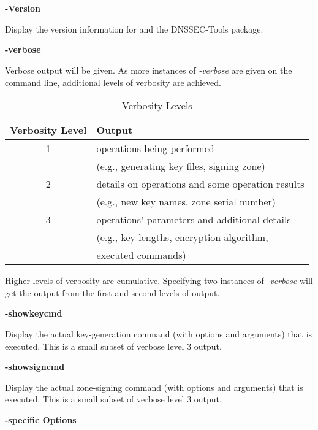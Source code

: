 \begin{description}
\item {\bf -Version}\verb" "

Display the version information for  and the DNSSEC-Tools
package.

\item {\bf -verbose}\verb" "

Verbose output will be given.  As more instances of {\it -verbose} are given
on the command line, additional levels of verbosity are achieved.

\begin{table}[ht]
\begin{center}
\begin{tabular}{|c|l|}
\hline
{\bf Verbosity Level} & {\bf Output} \\
\hline
1 & operations being performed \\
  & (e.g., generating key files, signing zone)  \\
2 & details on operations and some operation results \\
  & (e.g., new key names, zone serial number) \\
3 & operations' parameters and additional details \\
  & (e.g., key lengths, encryption algorithm, \\
  & executed commands) \\
\hline
\end{tabular}
\end{center}
\caption{ Verbosity Levels}
\end{table}

Higher levels of verbosity are cumulative.  Specifying two instances of
{\it -verbose} will get the output from the first and second levels of output.

\item {\bf -showkeycmd}\verb" "

Display the actual key-generation command (with options and arguments) that is
executed.  This is a small subset of verbose level 3 output.

\item {\bf -showsigncmd}\verb" "

Display the actual zone-signing command (with options and arguments) that is
executed.  This is a small subset of verbose level 3 output.

\end{description}

{\bf {}-specific Options}

